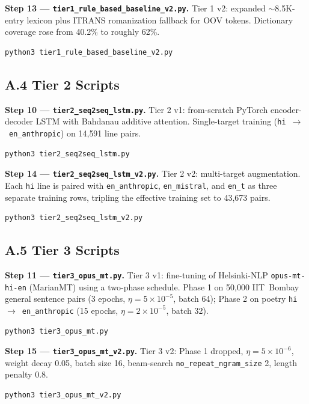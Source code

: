 \documentclass[11pt]{article}
\begin{document}
\textbf{Step 13 --- \texttt{tier1\_rule\_based\_baseline\_v2.py}.} Tier 1 v2: expanded $\sim$8.5K-entry lexicon plus ITRANS romanization fallback for OOV tokens. Dictionary coverage rose from 40.2\% to roughly 62\%.
\begin{lstlisting}[language=bash]
python3 tier1_rule_based_baseline_v2.py
\end{lstlisting}

\subsection*{A.4 Tier 2 Scripts}

\textbf{Step 10 --- \texttt{tier2\_seq2seq\_lstm.py}.} Tier 2 v1: from-scratch PyTorch encoder-decoder LSTM with Bahdanau additive attention. Single-target training (\texttt{hi}~$\rightarrow$~\texttt{en\_anthropic}) on 14{,}591 line pairs.
\begin{lstlisting}[language=bash]
python3 tier2_seq2seq_lstm.py
\end{lstlisting}

\textbf{Step 14 --- \texttt{tier2\_seq2seq\_lstm\_v2.py}.} Tier 2 v2: multi-target augmentation. Each \texttt{hi} line is paired with \texttt{en\_anthropic}, \texttt{en\_mistral}, and \texttt{en\_t} as three separate training rows, tripling the effective training set to 43{,}673 pairs.
\begin{lstlisting}[language=bash]
python3 tier2_seq2seq_lstm_v2.py
\end{lstlisting}

\subsection*{A.5 Tier 3 Scripts}

\textbf{Step 11 --- \texttt{tier3\_opus\_mt.py}.} Tier 3 v1: fine-tuning of Helsinki-NLP \texttt{opus-mt-hi-en} (MarianMT) using a two-phase schedule. Phase 1 on 50{,}000 IIT~Bombay general sentence pairs (3 epochs, $\eta{=}5{\times}10^{-5}$, batch 64); Phase 2 on poetry \texttt{hi}~$\rightarrow$~\texttt{en\_anthropic} (15 epochs, $\eta{=}2{\times}10^{-5}$, batch 32).
\begin{lstlisting}[language=bash]
python3 tier3_opus_mt.py
\end{lstlisting}

\textbf{Step 15 --- \texttt{tier3\_opus\_mt\_v2.py}.} Tier 3 v2: Phase 1 dropped, $\eta{=}5{\times}10^{-6}$, weight decay 0.05, batch size 16, beam-search \texttt{no\_repeat\_ngram\_size} 2, length penalty 0.8.
\begin{lstlisting}[language=bash]
python3 tier3_opus_mt_v2.py
\end{lstlisting}
\end{document}
